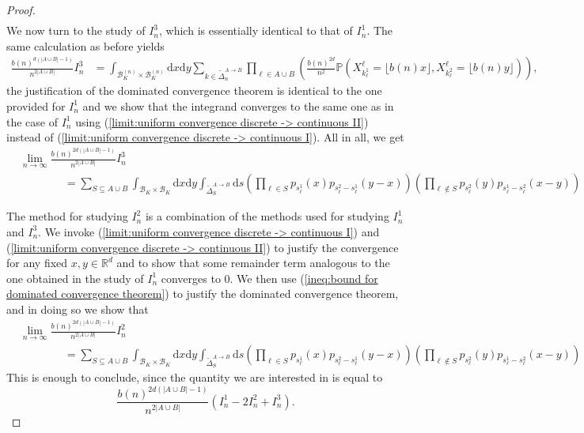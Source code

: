 \documentclass[10pt,a4paper]{amsart}
\newcommand{\RR}{\mathbb R}
\newcommand{\PP}{\mathbb P}
\newcommand{\1}{\mathds{1}}
\renewcommand{\d}{\mathrm d}
\numberwithin{equation}{section}
\begin{document}
\begin{proof}
\begin{align*}
    \end{align*}
    We now turn to the study of $I_n^3$, which is essentially identical to that of $I_n^1$. The same calculation as before yields
    \begin{align*}
        \frac{b(n)^{d(|A\cup B|-1)}}{n^{2|A\cup B|}}I_n^3&=\int_{\mathcal B_K^{(n)}\times\mathcal B_K^{(n)}}\d x\d y\sum_{k\in\widetilde\Delta_n^{A\rightarrow B}}\prod_{\ell\in A\cup B}\left(\frac{b(n)^{2d}}{n^2}\PP\left(X_{k_\ell^1}^{\ell}=\lfloor b(n)x\rfloor,X_{k_\ell^2}^{\ell}=\lfloor b(n)y\rfloor\right)\right),
    \end{align*}
    the justification of the dominated convergence theorem is identical to the one provided for $I_n^1$ and we show that the integrand converges to the same one as in the case of $I_n^1$ using (\ref{limit:uniform convergence discrete -> continuous II}) instead of (\ref{limit:uniform convergence discrete -> continuous I}). All in all, we get
    \begin{align*}
        &\lim_{n\rightarrow\infty}\frac{b(n)^{2d(|A\cup B|-1)}}{n^{2|A\cup B|}}I_n^3\\
        &\hspace{4em}=\sum_{S\subseteq A\cup B}\int_{\mathcal B_K\times\mathcal B_K}\d x\d y\int_{\widetilde\Delta_S^{A\rightarrow B}}\d s\left(\prod_{\ell\in S}p_{s_\ell^1}(x) p_{s_\ell^2-s_\ell^1}(y-x)\right)\left(\prod_{\ell\notin S}p_{s_\ell^2}(y) p_{s_\ell^1-s_\ell^2}(x-y)\right)
    \end{align*}

    The method for studying $I_n^2$ is a combination of the methods used for studying $I_n^1$ and $I_n^3$. We invoke (\ref{limit:uniform convergence discrete -> continuous I}) and (\ref{limit:uniform convergence discrete -> continuous II}) to justify the convergence for any fixed $x,y\in\RR^d$ and to show that some remainder term analogous to the one obtained in the study of $I_n^1$ converges to $0$. We then use (\ref{ineq:bound for dominated convergence theorem}) to justify the dominated convergence theorem, and in doing so we show that 
    \begin{align*}
        &\lim_{n\rightarrow\infty}\frac{b(n)^{2d(|A\cup B|-1)}}{n^{2|A\cup B|}}I_n^2\\
        &\hspace{4em}=\sum_{S\subseteq A\cup B}\int_{\mathcal B_K\times\mathcal B_K}\d x\d y\int_{\widetilde\Delta_S^{A\rightarrow B}}\d s\left(\prod_{\ell\in S}p_{s_\ell^1}(x) p_{s_\ell^2-s_\ell^1}(y-x)\right)\left(\prod_{\ell\notin S}p_{s_\ell^2}(y) p_{s_\ell^1-s_\ell^2}(x-y)\right)
    \end{align*}
     This is enough to conclude, since the quantity we are interested in is equal to
     \begin{equation*}
         \frac{b(n)^{2d(|A\cup B|-1)}}{n^{2|A\cup B|}}\left(I_n^1-2I_n^2+I_n^3\right).
     \end{equation*}

\end{proof}
\end{document}
